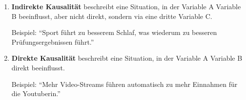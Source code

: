 \begin{mydefinition}[Kausalität]
\begin{enumerate}
	\item \textbf{Indirekte Kausalität} beschreibt eine Situation, in der Variable A Variable B beeinflusst, aber nicht direkt, sondern via eine dritte Variable C.
	      \begin{center}
	      \end{center}
	      Beispiel: \enquote{Sport führt zu besserem Schlaf, was wiederum zu besseren Prüfungsergebnissen führt.}
	\item \textbf{Direkte Kausalität} beschreibt eine Situation, in der Variable A Variable B direkt beeinflusst.
	      \begin{center}
	      \end{center}
	      Beispiel: \enquote{Mehr Video-Streams führen automatisch zu mehr Einnahmen für die Youtuberin.}
\end{enumerate}
\end{mydefinition}


